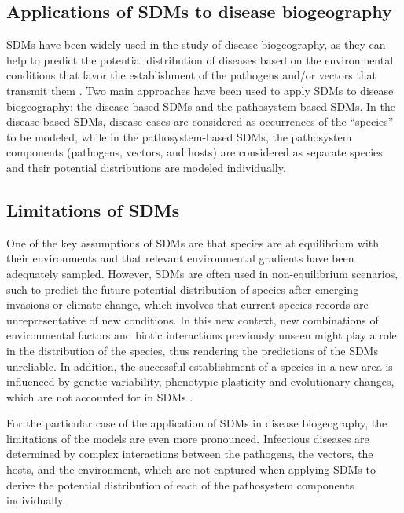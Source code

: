 \subsection{\label{sec:Applications of SDMs to disease biogeography}
  Applications of SDMs to disease biogeography}

SDMs have been widely used in the study of disease biogeography, as they can
help to predict the potential distribution of diseases based on the
environmental conditions that favor the establishment of the pathogens and/or
vectors that transmit them \cite{Pigott2014,Barro2016,Alimi2015}. Two main
approaches have been used to apply SDMs to disease biogeography: the
disease-based SDMs and the pathosystem-based SDMs. In the disease-based SDMs,
disease cases are considered as occurrences of the ``species'' to be modeled,
while in the pathosystem-based SDMs, the pathosystem components (pathogens,
vectors, and hosts) are considered as separate species and their potential
distributions are modeled individually.


\subsection{\label{sec:Limitations of SDMs} Limitations of SDMs}

One of the key assumptions of SDMs are that species are at equilibrium with
their environments and that relevant environmental gradients have been
adequately sampled. However, SDMs are often used in non-equilibrium scenarios,
such to predict the future potential distribution of species after emerging
invasions or climate change, which involves that current species records are
unrepresentative of new conditions. In this new context, new combinations of
environmental factors and biotic interactions previously unseen might play a
role in the distribution of the species, thus rendering the predictions of the
SDMs unreliable. In addition, the successful establishment of a species in a
new area is influenced by genetic variability, phenotypic plasticity and
evolutionary changes, which are not accounted for in SDMs \cite{Elith2009}.

For the particular case of the application of SDMs in disease biogeography, the
limitations of the models are even more pronounced. Infectious diseases are
determined by complex interactions between the pathogens, the vectors, the
hosts, and the environment, which are not captured when applying SDMs to derive
the potential distribution of each of the pathosystem components individually.

